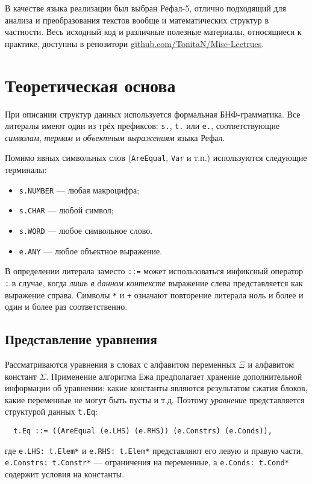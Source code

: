 \documentclass[12pt]{article}
\begin{document}
В качестве языка реализации был выбран Рефал-5, отлично подходящий для анализа
и преобразования текстов вообще и математических структур в частности. Весь
исходный код и различные полезные материалы, относящиеся к практике, доступны
в репозитори \href{https://github.com/TonitaN/Misc-Lectures}
{github.com/TonitaN/Misc-Lectrues}.



\section{Теоретическая основа} \label{base}

При описании структур данных используется формальная БНФ-грамматика. Все
литералы имеют один из трёх префиксов: \texttt{s.}, \texttt{t.} или
\texttt{e.}, соответствующие \textit{символам}, \textit{термам} и
\textit{объектным выражениям} языка Рефал.

Помимо явных символьных слов (\texttt{AreEqual}, \texttt{Var} и т.п.)
используются следующие терминалы:
\begin{itemize}
  \item \texttt{s.NUMBER} --- любая макроцифра; 
  \item \texttt{s.CHAR} --- любой символ; 
  \item \texttt{s.WORD} --- любое символьное слово.
  \item \texttt{e.ANY} --- любое объектное выражение.
\end{itemize}
В определении литерала заместо \texttt{::=} может использоваться инфиксный
оператор \texttt{:} в случае, когда \textit{лишь в данном контексте}
выражение слева представляется как выражение справа. Символы \texttt{*} и
\texttt{+} означают повторение литерала ноль и более и один и более раз
соответственно.


\subsection{Представление уравнения}

Рассматриваются уравнения в словах с алфавитом переменных $\Xi$ и алфавитом
констант $\Sigma$. Применение алгоритма Ежа предполагает хранение
дополнительной информации об уравнении: какие константы являются результатом
сжатия блоков, какие переменные не могут быть пусты и т.д. Поэтому
\textit{уравнение} представляется структурой данных \texttt{t.Eq}:
\begin{Verbatim}
  t.Eq ::= ((AreEqual (e.LHS) (e.RHS)) (e.Constrs) (e.Conds)),
\end{Verbatim}
где \texttt{e.LHS: t.Elem*} и \texttt{e.RHS: t.Elem*} представляют его левую и
правую части, \texttt{e.Constrs: t.Constr*} --- ограничения на переменные,
а \texttt{e.Conds: t.Cond*} содержит условия на константы.
\end{document}
